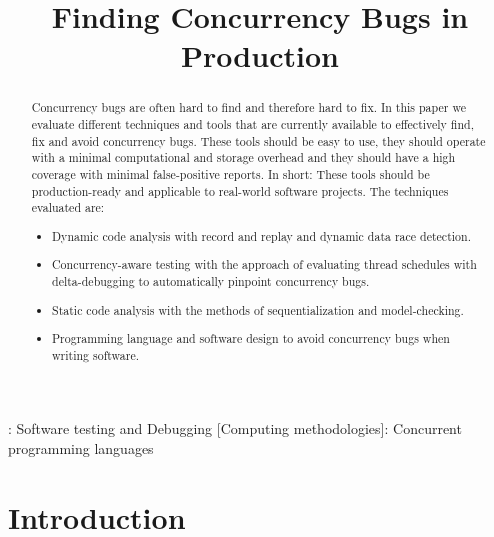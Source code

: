 \documentclass[conference]{IEEEtran}
\begin{document}
\title{Finding Concurrency Bugs in Production}

\author{
}

\maketitle

\begin{abstract}
Concurrency bugs are often hard to find and therefore hard to fix.
In this paper we evaluate different techniques and tools that are currently available to effectively find, fix and avoid concurrency bugs.
These tools should be easy to use, they should operate with a minimal computational and storage overhead and they should have a high coverage with minimal false-positive reports.
In short: These tools should be production-ready and applicable to real-world software projects.
The techniques evaluated are:
\begin{itemize}
    \item Dynamic code analysis with record and replay and dynamic data race detection.
    \item Concurrency-aware testing with the approach of evaluating thread schedules with delta-debugging to automatically pinpoint concurrency bugs.
    \item Static code analysis with the methods of sequentialization and model-checking.
    \item Programming language and software design to avoid concurrency bugs when writing software.
\end{itemize}
\end{abstract}

\begin{IEEEkeywords}
    : Software testing and Debugging
    [Computing methodologies]: Concurrent programming languages
\end{IEEEkeywords}


\section{Introduction}
\end{document}
